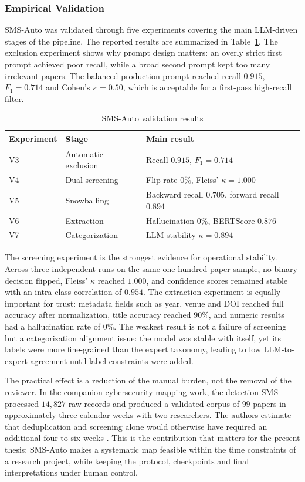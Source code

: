 \subsubsection{Empirical Validation}

SMS-Auto was validated through five experiments covering the main
LLM-driven stages of the pipeline. The reported results are summarized
in Table~\ref{tab:sms-auto-validation}. The exclusion experiment shows
why prompt design matters: an overly strict first prompt achieved poor
recall, while a broad second prompt kept too many irrelevant papers.
The balanced production prompt reached recall $0.915$, $F_1=0.714$ and
Cohen's $\kappa=0.50$, which is acceptable for a first-pass high-recall
filter.

\begin{table}[htbp]
\centering
\small
\begin{tabular}{lll}
\hline
Experiment & Stage & Main result \\
\hline
V3 & Automatic exclusion & Recall $0.915$, $F_1=0.714$ \\
V4 & Dual screening & Flip rate $0\%$, Fleiss' $\kappa=1.000$ \\
V5 & Snowballing & Backward recall $0.705$, forward recall $0.894$ \\
V6 & Extraction & Hallucination $0\%$, BERTScore $0.876$ \\
V7 & Categorization & LLM stability $\kappa=0.894$ \\
\hline
\end{tabular}
\caption{SMS-Auto validation results}
\label{tab:sms-auto-validation}
\end{table}

The screening experiment is the strongest evidence for operational
stability. Across three independent runs on the same one hundred-paper
sample, no binary decision flipped, Fleiss' $\kappa$ reached $1.000$,
and confidence scores remained stable with an intra-class correlation
of $0.954$. The extraction experiment is equally important for trust:
metadata fields such as year, venue and DOI reached full accuracy after
normalization, title accuracy reached $90\%$, and numeric results had a
hallucination rate of $0\%$. The weakest result is not a failure of
screening but a categorization alignment issue: the model was stable
with itself, yet its labels were more fine-grained than the expert
taxonomy, leading to low LLM-to-expert agreement until label
constraints were added.

The practical effect is a reduction of the manual burden, not the
removal of the reviewer. In the companion cybersecurity mapping work,
the detection SMS processed $14{,}827$ raw records and produced a
validated corpus of $99$ papers in approximately three calendar weeks
with two researchers. The authors estimate that deduplication and
screening alone would otherwise have required an additional four to six
weeks \cite{nouali2026smsauto}. This is the contribution that matters
for the present thesis: SMS-Auto makes a systematic map feasible within
the time constraints of a research project, while keeping the protocol,
checkpoints and final interpretations under human control.





